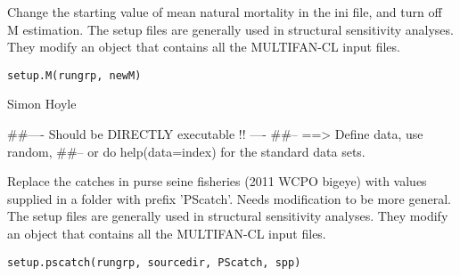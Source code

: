 \documentclass[a4paper]{book}
\begin{document}
%
\begin{Description}\relax

Change the starting value of mean natural mortality in the ini file, and turn off M estimation. 
The setup files are generally used in structural sensitivity analyses. They modify an object that contains all the MULTIFAN-CL input files. 
\end{Description}
%
\begin{Usage}
\begin{verbatim}
setup.M(rungrp, newM)
\end{verbatim}
\end{Usage}
%
\begin{Arguments}
\begin{ldescription}
\item[\code{rungrp}] 


\item[\code{newM}] 


\end{ldescription}
\end{Arguments}
%
\begin{Author}\relax

Simon Hoyle
\end{Author}
%
\begin{Examples}
\begin{ExampleCode}
##---- Should be DIRECTLY executable !! ----
##-- ==>  Define data, use random,
##--	or do  help(data=index)  for the standard data sets.

\end{ExampleCode}
\end{Examples}
%
\begin{Description}\relax

Replace the catches in purse seine fisheries (2011 WCPO bigeye) with values supplied in a folder with prefix 'PScatch'. Needs modification to be more general. 
The setup files are generally used in structural sensitivity analyses. They modify an object that contains all the MULTIFAN-CL input files. 
\end{Description}
%
\begin{Usage}
\begin{verbatim}
setup.pscatch(rungrp, sourcedir, PScatch, spp)
\end{verbatim}
\end{Usage}
\end{document}
